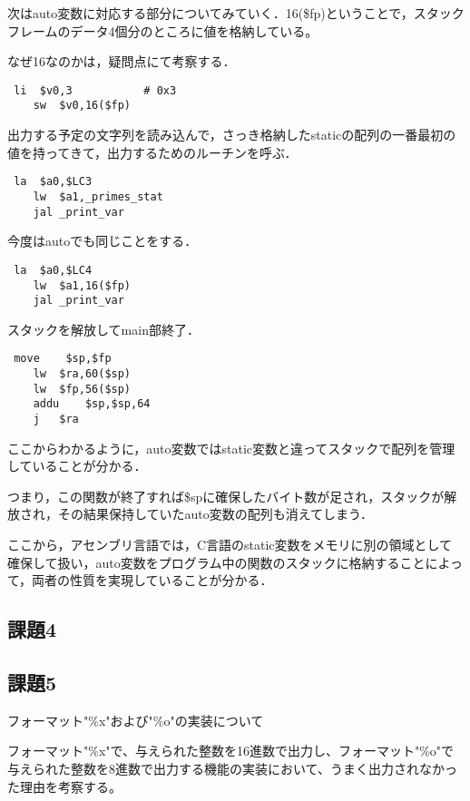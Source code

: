 \documentclass[a4j]{jarticle}
\begin{document}
次はauto変数に対応する部分についてみていく．16(\$fp)ということで，スタックフレームのデータ4個分のところに値を格納している。

なぜ16なのかは，疑問点にて考察する．

\begin{verbatim}
 li  $v0,3           # 0x3
    sw  $v0,16($fp)
\end{verbatim}

出力する予定の文字列を読み込んで，さっき格納したstaticの配列の一番最初の値を持ってきて，出力するためのルーチンを呼ぶ．

\begin{verbatim}
 la  $a0,$LC3
    lw  $a1,_primes_stat
    jal _print_var
\end{verbatim}

今度はautoでも同じことをする．

\begin{verbatim}
 la  $a0,$LC4
    lw  $a1,16($fp)
    jal _print_var
\end{verbatim}

スタックを解放してmain部終了．

\begin{verbatim}
 move    $sp,$fp
    lw  $ra,60($sp)
    lw  $fp,56($sp)
    addu    $sp,$sp,64
    j   $ra
\end{verbatim}

ここからわかるように，auto変数ではstatic変数と違ってスタックで配列を管理していることが分かる．

つまり，この関数が終了すれば\$spに確保したバイト数が足され，スタックが解放され，その結果保持していたauto変数の配列も消えてしまう．

ここから，アセンブリ言語では，C言語のstatic変数をメモリに別の領域として確保して扱い，auto変数をプログラム中の関数のスタックに格納することによって，両者の性質を実現していることが分かる．


\subsection{課題4}

\subsection{課題5}


フォーマット"\%x"および"\%o"の実装について

フォーマット"\%x"で、与えられた整数を16進数で出力し、フォーマット"\%o"で与えられた整数を8進数で出力する機能の実装において、うまく出力されなかった理由を考察する。
\end{document}
